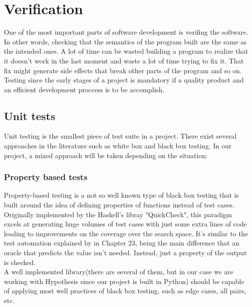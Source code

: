 \section{Verification}
  One of the most important parts of software development is verifing the
  software. In other words, checking that the semantics of the program built
  are the same as the intended ones. A lot of time can be wasted building a
  program to realize that it doesn't work in the last moment and waste a lot
  of time trying to fix it. That fix might generate side effects that break other
  parts of the program and so on. Testing since the early stages of a project
  is mandatory if a quality product and an efficient development
  proccess is to be accomplish.

  \subsection{Unit tests}

    Unit testing is the smallest piece of test suite in a project. There exist
    several approaches in the literature such as white box and black box
    testing. In our project, a mixed approach will be taken depending on the
    situation:

    \subsubsection{Property based tests}

    Property-based testing is a not so well known type of black box testing that
    is built around the idea of defining properties of functions instead of
    test cases. Originally implemented by the Haskell's libray
    "QuickCheck"\cite{QuickCheck}, this paradigm excels at generating huge
    volumes of test cases with just some extra lines of code leading
    to improvements on the coverage over the search space. It's similar to the
    test automation explained by \citet{Sommerville} in Chapter 23, being the
    main difference that an oracle that predicts the value isn't needed.
    Instead, just a property of the output is checked.\\

    A well implemented library(there are several of them, but in our case we are
    working with Hypothesis\cite{Hypothesis} since our project is built in
    Python) should be capable of applying most well practices of black box
    testing, such as edge cases, all pairs, etc.\\

